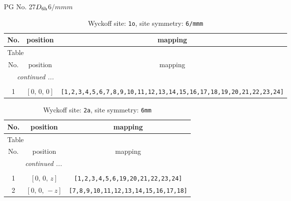 \documentclass[fleqn,8pt]{jsarticle}
\begin{document}
\setcounter{MaxMatrixCols}{32}

\renewcommand{\tablename}{Table~}
\renewcommand{\figurename}{Figure~}
\begin{center}
\LARGE
PG No. 27\quad$D_{\rm 6h}$\quad$6/mmm$\quad[ hexagonal ]
\end{center}
\renewcommand{\arraystretch}{1.2}
\begin{longtable}{ccc}
\caption{Wyckoff site: {\tt 1o}, site symmetry: {\tt 6/mmm}}
 \\
 \hline \hline
No. & position & mapping \\ \hline \endfirsthead

\multicolumn{2}{l}{\tablename\ \thetable{}} \\
 \hline \hline
No. & position & mapping \\ \hline \endhead

 \hline \hline
\multicolumn{2}{r}{\footnotesize\it continued ...} \\ \endfoot

 \hline \hline
\multicolumn{2}{r}{} \\ \endlastfoot

1 & $\left[ 0,\, 0,\, 0 \right]$ & {\tt [1,2,3,4,5,6,7,8,9,10,11,12,13,14,15,16,17,18,19,20,21,22,23,24]} \\
\end{longtable}
\renewcommand{\arraystretch}{1.2}
\begin{longtable}{ccc}
\caption{Wyckoff site: {\tt 2a}, site symmetry: {\tt 6mm}}
 \\
 \hline \hline
No. & position & mapping \\ \hline \endfirsthead

\multicolumn{2}{l}{\tablename\ \thetable{}} \\
 \hline \hline
No. & position & mapping \\ \hline \endhead

 \hline \hline
\multicolumn{2}{r}{\footnotesize\it continued ...} \\ \endfoot

 \hline \hline
\multicolumn{2}{r}{} \\ \endlastfoot

1 & $\left[ 0,\, 0,\, z \right]$ & {\tt [1,2,3,4,5,6,19,20,21,22,23,24]} \\ \hline
2 & $\left[ 0,\, 0,\, - z \right]$ & {\tt [7,8,9,10,11,12,13,14,15,16,17,18]} \\
\end{longtable}
\renewcommand{\arraystretch}{1.2}
\end{document}
